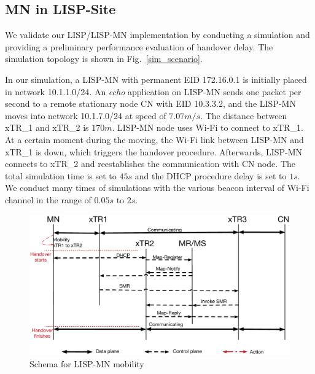 \subsection{MN in LISP-Site}
\label{sec:ns3_analysis_xTR}
We validate our LISP/LISP-MN implementation by conducting a simulation and providing a preliminary performance evaluation of handover delay. The simulation topology is shown in Fig.~\ref{sim_scenario}.

In our simulation, a LISP-MN with permanent EID 172.16.0.1 is initially placed in network 10.1.1.0/24. An \emph{echo} application on LISP-MN sends one packet per second to a remote stationary node CN with EID 10.3.3.2, and the LISP-MN moves into network 10.1.7.0/24 at speed of $7.07m/s$. The distance between xTR\_1 and xTR\_2 is $170m$. LISP-MN node uses Wi-Fi to connect to xTR\_1. At a certain moment during the moving, the Wi-Fi link between LISP-MN and xTR\_1 is down, which triggers the handover procedure. Afterwards, LISP-MN connects to xTR\_2 and reestablishes the communication with CN node. The total simulation time is set to $45s$ and the DHCP procedure delay is set to $1s$. We conduct many times of simulations with the various beacon interval of Wi-Fi channel in the range of $0.05s$ to $2s$.

\begin{figure}[!th]
	\centering
	\includegraphics[width=\textwidth]{Pics/Mobility_xTR_schema_SMR_simplify}
	\caption{Schema for LISP-MN mobility}
	\label{sim_schema}
\end{figure}

